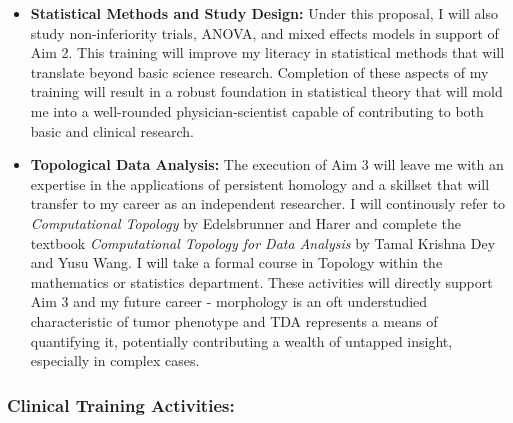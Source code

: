 \documentclass{NIHGrant}
\begin{document}
\begin{itemize}[leftmargin=*, nosep]
  \item \textbf{Statistical Methods and Study Design:} Under this proposal, I will also study non-inferiority trials, ANOVA, and mixed effects models in support of Aim 2. This training will improve my literacy in statistical methods that will translate beyond basic science research. Completion of these aspects of my training will result in a robust foundation in statistical theory that will mold me into a well-rounded physician-scientist capable of contributing to both basic and clinical research.
  \item \textbf{Topological Data Analysis:} The execution of Aim 3 will leave me with an expertise in the applications of persistent homology and a skillset that will transfer to my career as an independent researcher. I will continously refer to \textit{Computational Topology} by Edelsbrunner and Harer and complete the textbook \textit{Computational Topology for Data Analysis} by Tamal Krishna Dey and Yusu Wang. I will take a formal course in Topology within the mathematics or statistics department. These activities will directly support Aim 3 and my future career - morphology is an oft understudied characteristic of tumor phenotype and TDA represents a means of quantifying it, potentially contributing a wealth of untapped insight, especially in complex cases.
\end{itemize}

\subsubsection*{Clinical Training Activities:}
\end{document}
